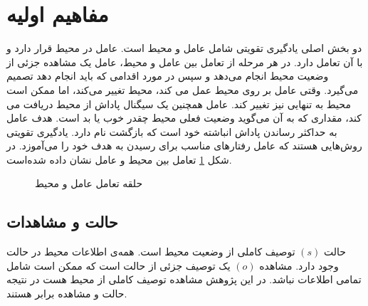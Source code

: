 \section{مفاهیم اولیه}
دو بخش اصلی یادگیری تقویتی
شامل عامل
 و محیط
  است. عامل در محیط قرار دارد و با آن تعامل دارد.
  در هر مرحله از تعامل بین عامل و محیط، عامل یک مشاهده جزئی از وضعیت محیط انجام می‌دهد و سپس در مورد اقدامی که باید انجام دهد تصمیم می‌گیرد. وقتی عامل بر روی محیط عمل می کند، محیط تغییر می‌کند، اما ممکن است محیط به تنهایی نیز تغییر کند.
  عامل همچنین یک سیگنال پاداش
   از محیط دریافت می کند، مقداری که به آن می‌گوید وضعیت فعلی محیط چقدر خوب یا بد است. هدف عامل به حداکثر رساندن پاداش انباشته خود است که بازگشت
    نام دارد. یادگیری تقویتی روش‌هایی هستند که عامل رفتارهای مناسب برای رسیدن به هدف خود را می‌آموزد. در شکل
    \ref{fig:agent_env}
    تعامل بین محیط و عامل نشان داده شده‌است.
\begin{figure}[H]
	\begin{center}
	\end{center}
	\caption{حلقه تعامل عامل و محیط}
	\label{fig:agent_env}
\end{figure}
\subsection{حالت و مشاهدات}
حالت
\((s)\)
 توصیف کاملی از وضعیت محیط است. همه‌ی اطلاعات محیط در حالت وجود دارد. مشاهده
 \((o)\)
  یک توصیف جزئی از حالت است که ممکن است شامل تمامی اطلاعات نباشد. در این پژوهش مشاهده توصیف کاملی از محیط هست در نتیجه حالت و مشاهده برابر هستند.

